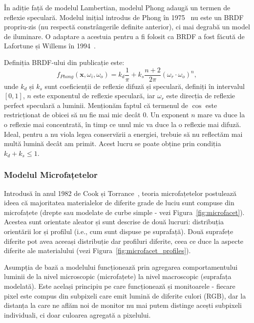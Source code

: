 \documentclass[12pt,a4paper]{report}
\numberwithin{equation}{section} %
\begin{document}
În adiție față de modelul Lambertian, modelul Phong adaugă un termen de reflexie
speculară. Modelul inițial introdus de Phong în 1975~\cite{Phong} nu este un BRDF
propriu-zis (nu respectă constrângerile definite anterior), ci mai degrabă un model de iluminare. O adaptare a acestuia pentru
a fi folosit ca BRDF a fost făcută de Lafortune și Willems în 1994~\cite{Lafortune}.

Definiția BRDF-ului din publicație este:
\begin{equation}\label{eq:phong}
	f_{Phong}(\mathbf{x}, \omega_i, \omega_o) = k_d\frac{1}{\pi} + k_s\frac{n + 2}{2\pi}(\omega_r \cdot \omega_o)^n,
\end{equation}
unde $k_d$ și $k_s$ sunt coeficienții de reflexie difuză și speculară, definiți
în intervalul $[0, 1]$, $n$ este exponentul de reflexie speculară, iar $\omega_r$ este
direcția de reflexie perfect speculară a luminii. Menționăm faptul că termenul de $\cos$
este restricționat de obicei să nu fie mai mic decât 0. Un exponent $n$ mare va duce la o
reflexie mai concentrată, în timp ce unul mic va duce la o reflexie mai difuză.
Ideal, pentru a nu viola legea conservării a energiei, trebuie să nu reflectăm mai multă lumină
decât am primit. Acest lucru se poate obține prin condiția $k_d + k_s \leq 1$.

\subsubsection*{Modelul Microfațetelor}
Introdusă în anul 1982 de Cook și Torrance~\cite{CookTorrance}, teoria microfațetelor postulează ideea că
majoritatea materialelor de diferite grade de luciu sunt compuse din microfațete
(drepte sau modelate de curbe simple - vezi Figura~\ref{fig:microfacet}). Acestea sunt orientate aleator și
sunt descrise de două lucruri: distribuția orientării lor și profilul (i.e.,
cum sunt dispuse pe suprafață). Două suprafețe diferite pot avea aceeași distribuție
dar profiluri diferite, ceea ce duce la aspecte diferite ale materialului (vezi Figura~\ref{fig:microfacet_profiles}).

Asumpția de bază a modelului funcționează prin agregarea comportamentului
luminii de la nivel microscopic (microfațete) la nivel macroscopic (suprafața modelată).
Este același principiu pe care funcționează și monitoarele - fiecare pixel este compus
din subpixeli care emit lumină de diferite culori (RGB), dar la distanța la care
ne aflăm noi de monitor nu mai putem distinge acești subpixeli individuali, ci doar
culoarea agregată a pixelului.
\end{document}
